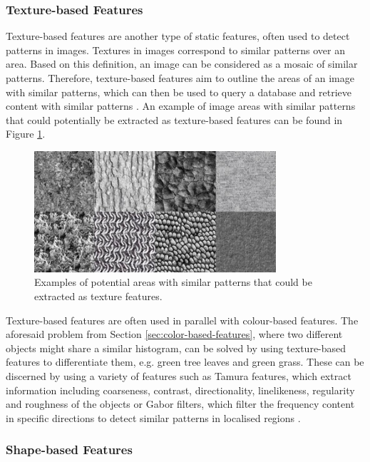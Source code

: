 \subsubsection{Texture-based Features}

Texture-based features are another type of static features, often used to detect patterns in images. Textures in images correspond to similar patterns over an area. Based on this definition, an image can be considered as a mosaic of similar patterns. Therefore, texture-based features aim to outline the areas of an image with similar patterns, which can then be used to query a database and retrieve content with similar patterns \cite{manjunath1996texture}. An example of image areas with similar patterns that could potentially be extracted as texture-based features can be found in Figure \ref{fig:litsurvey-texture-feature-example}.

\begin{figure}[h] 
\centerline{\includegraphics[width=0.80\textwidth]{figures/litsurvey/texture-feature-example.jpg}}
\caption{\label{fig:litsurvey-texture-feature-example}Examples of potential areas with similar patterns that could be extracted as texture features.}
\end{figure}

Texture-based features are often used in parallel with colour-based features. The aforesaid problem from Section \ref{sec:color-based-features}, where two different objects might share a similar histogram, can be solved by using texture-based features to differentiate them, e.g. green tree leaves and green grass. These can be discerned by using a variety of features such as Tamura features, which extract information including coarseness, contrast, directionality, linelikeness, regularity and roughness of the objects \cite{amir2003ibm} or Gabor filters, which filter the frequency content in specific directions to detect similar patterns in localised regions \cite{manjunath1996texture}. 

\subsubsection{Shape-based Features}

